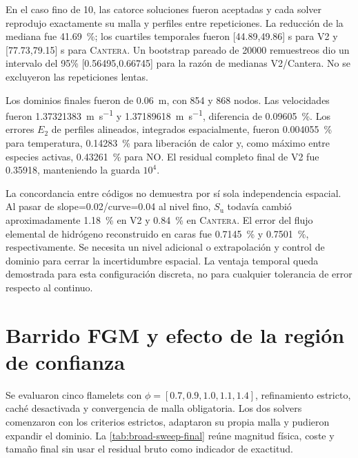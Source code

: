 \documentclass[12pt,a4paper,twoside,openany]{book}
\newcommand{\Su}{S_{\mathrm{u}}}
\newcommand{\Vdos}{\textsc{V2}\xspace}
\newcommand{\Cantera}{\textsc{Cantera}\xspace}
\begin{document}
En el caso fino de \SI{10}{\atmosphere}, las catorce soluciones fueron
aceptadas y cada solver reprodujo exactamente su malla y perfiles entre
repeticiones. La reducción de la mediana fue \SI{41.69}{\percent}; los
cuartiles temporales fueron [44.89,49.86] s para \Vdos y [77.73,79.15] s
para \Cantera. Un bootstrap pareado de 20000 remuestreos dio un intervalo
del 95\% [0.56495,0.66745] para la razón de medianas V2/Cantera.
No se excluyeron las repeticiones lentas.

Los dominios finales fueron de \SI{0.06}{\metre}, con 854 y 868 nodos.
Las velocidades fueron \SI{1.37321383}{\metre\per\second} y
\SI{1.37189618}{\metre\per\second}, diferencia de \SI{0.09605}{\percent}.
Los errores \(E_2\) de perfiles alineados, integrados espacialmente, fueron
\SI{0.004055}{\percent} para temperatura, \SI{0.14283}{\percent} para
liberación de calor y, como máximo entre especies activas,
\SI{0.43261}{\percent} para NO. El residual completo final de \Vdos fue
0.35918, manteniendo la guarda \(10^4\).

La concordancia entre códigos no demuestra por sí sola independencia
espacial. Al pasar de slope=0.02/curve=0.04 al nivel fino, \(\Su\) todavía
cambió aproximadamente \SI{1.18}{\percent} en \Vdos y
\SI{0.84}{\percent} en \Cantera. El error del flujo elemental de hidrógeno
reconstruido en caras fue \SI{0.7145}{\percent} y \SI{0.7501}{\percent},
respectivamente. Se necesita un nivel adicional o extrapolación y control
de dominio para cerrar la incertidumbre espacial. La ventaja temporal queda
demostrada para esta configuración discreta, no para cualquier tolerancia
de error respecto al continuo.

\section{Barrido FGM y efecto de la región de confianza}

Se evaluaron cinco flamelets con
\(\phi=[0.7,0.9,1.0,1.1,1.4]\), refinamiento estricto, caché desactivada y
convergencia de malla obligatoria. Los dos solvers comenzaron con los criterios
estrictos, adaptaron su propia malla y pudieron expandir el dominio. La
\cref{tab:broad-sweep-final} reúne magnitud física, coste y tamaño final sin usar
el residual bruto como indicador de exactitud.
\end{document}

